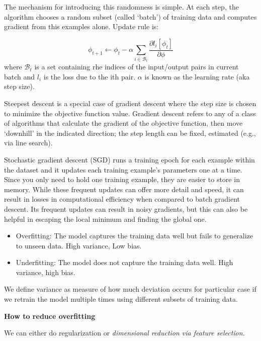 \documentclass[11pt]{article}
\begin{document}
The mechanism for introducing this randomness is simple. At each step, 
the algorithm chooses a random subset (called `batch') of training data and computes gradient 
from this examples alone. Update rule is:

\begin{equation}
\phi_{t+1} \leftarrow \phi_{t} - \alpha \sum_{i \in \mathcal{B}_{t}} \frac{\partial l_i[\phi_t]}{\partial \phi}
\end{equation}
where $\mathcal{B}_{t}$ is a set containing rhe indices of the input/output pairs in current batch and $l_i$
is the loss due to the ith pair. $\alpha$ is known as the learning rate (aka step size). 


Steepest descent is a special case of gradient descent where the step size is chosen to minimize the objective function value. 
Gradient descent refers to any of a class of algorithms that calculate the gradient of the objective function, then move 
`downhill' in the indicated direction; the step length can be fixed, estimated (e.g., via line search). 

Stochastic gradient descent (SGD) runs a training epoch for each example within the dataset and it updates each training example's parameters one at a time. Since you only need to hold one training example, they are easier to store in memory. While these frequent updates can offer more detail and speed, it can result in losses in computational efficiency when compared to batch gradient descent. Its frequent updates can result in noisy gradients, but this can also be helpful in escaping the local minimum and finding the global one.




\begin{itemize} 
\item Overfitting: The model captures the training data well but fails to generalize to unseen data. High variance, Low bias. 
\item Underfitting: The model does not capture the training data well. High variance, high bias. 
\end{itemize} 


We define variance as measure of how much deviation occurs for particular case if we retrain the model
multiple times using different subsets of training data. 

\textbf{How to reduce overfitting}

We can either do regularization or \emph{dimensional reduction via feature selection}. 
\end{document}
